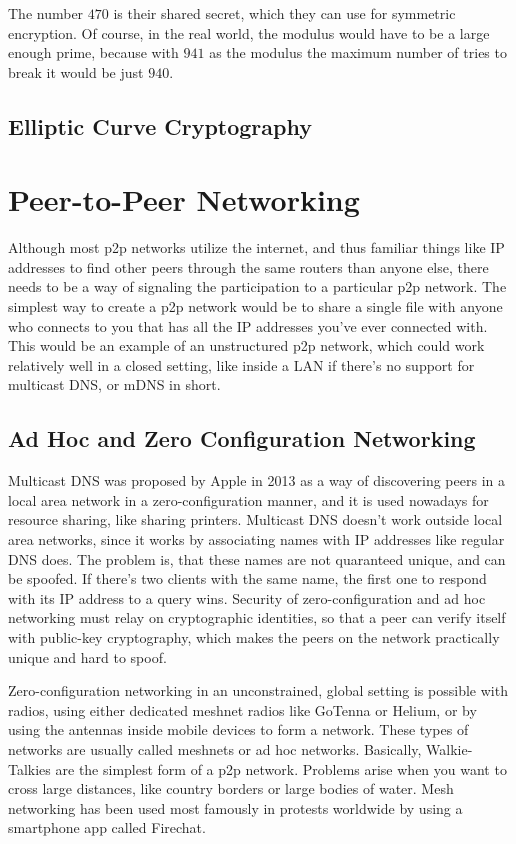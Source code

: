The number $470$ is their shared secret, which they can use for symmetric encryption. Of course, in the real world, the modulus would have to be a large enough prime, because with $941$ as the modulus the maximum number of tries to break it would be just $940$. 

\section{Elliptic Curve Cryptography}
						
\chapter{Peer-to-Peer Networking}
\label{Peer-to-Peer Networking}
Although most p2p networks utilize the internet, and thus familiar things like IP addresses to find other peers through the same routers than anyone else, there needs to be a way of signaling the participation to a particular p2p network. The simplest way to create a p2p network would be to share a single file with anyone who connects to you that has all the IP addresses you've ever connected with. This would be an example of an unstructured p2p network, which could work relatively well in a closed setting, like inside a LAN if there's no support for multicast DNS, or mDNS in short.

\section{Ad Hoc and Zero Configuration Networking}
Multicast DNS was proposed by Apple in 2013\cite{Cheshire2013-ja} as a way of discovering peers in a local area network in a zero-configuration manner, and it is used nowadays for resource sharing, like sharing printers. Multicast DNS doesn't work outside local area networks, since it works by associating names with IP addresses like regular DNS does. The problem is, that these names are not quaranteed unique, and can be spoofed. If there's two clients with the same name, the first one to respond with its IP address to a query wins.\cite{Pdp2008-tg} Security of zero-configuration and ad hoc networking must relay on cryptographic identities, so that a peer can verify itself with public-key cryptography, which makes the peers on the network practically unique and hard to spoof.

Zero-configuration networking in an unconstrained, global setting is possible with radios, using either dedicated meshnet radios like GoTenna or Helium, or by using the antennas inside mobile devices to form a network. These types of networks are usually called meshnets or ad hoc networks. Basically, Walkie-Talkies are the simplest form of a p2p network. Problems arise when you want to cross large distances, like country borders or large bodies of water. Mesh networking has been used most famously in protests worldwide by using a smartphone app called Firechat.\cite{Milian2014-mt}

